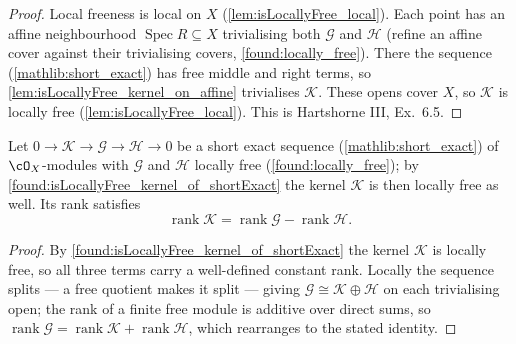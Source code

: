 \begin{proof}
  Local freeness is local on \(X\) (\cref{lem:isLocallyFree_local}).  Each point has
  an affine neighbourhood \(\operatorname{Spec}R\subseteq X\) trivialising both
  \(\mathcal G\) and \(\mathcal H\) (refine an affine cover against their
  trivialising covers, \cref{found:locally_free}).  There the sequence
  (\cref{mathlib:short_exact}) has free middle and right terms, so
  \cref{lem:isLocallyFree_kernel_on_affine} trivialises \(\mathcal K\).  These opens
  cover \(X\), so \(\mathcal K\) is locally free (\cref{lem:isLocallyFree_local}).
  This is Hartshorne III, Ex.~6.5.
\end{proof}

\begin{lemma}
  \label{found:rank_kernel_of_shortExact}
  Let \(0\to\mathcal K\to\mathcal G\to\mathcal H\to 0\) be a short exact sequence
  (\cref{mathlib:short_exact}) of \(\cO_X\)-modules with \(\mathcal G\) and
  \(\mathcal H\) locally free (\cref{found:locally_free}); by
  \cref{found:isLocallyFree_kernel_of_shortExact} the kernel \(\mathcal K\) is then
  locally free as well.  Its rank satisfies
  \[
    \operatorname{rank}\mathcal K=\operatorname{rank}\mathcal G-\operatorname{rank}\mathcal H .
  \]
\end{lemma}

\begin{proof}
  By \cref{found:isLocallyFree_kernel_of_shortExact} the kernel \(\mathcal K\) is
  locally free, so all three terms carry a well-defined constant rank.  Locally the
  sequence splits --- a free quotient makes it split --- giving
  \(\mathcal G\cong\mathcal K\oplus\mathcal H\) on each trivialising open; the rank
  of a finite free module is additive over direct sums, so
  \(\operatorname{rank}\mathcal G=\operatorname{rank}\mathcal K+\operatorname{rank}
  \mathcal H\), which rearranges to the stated identity.
\end{proof}

